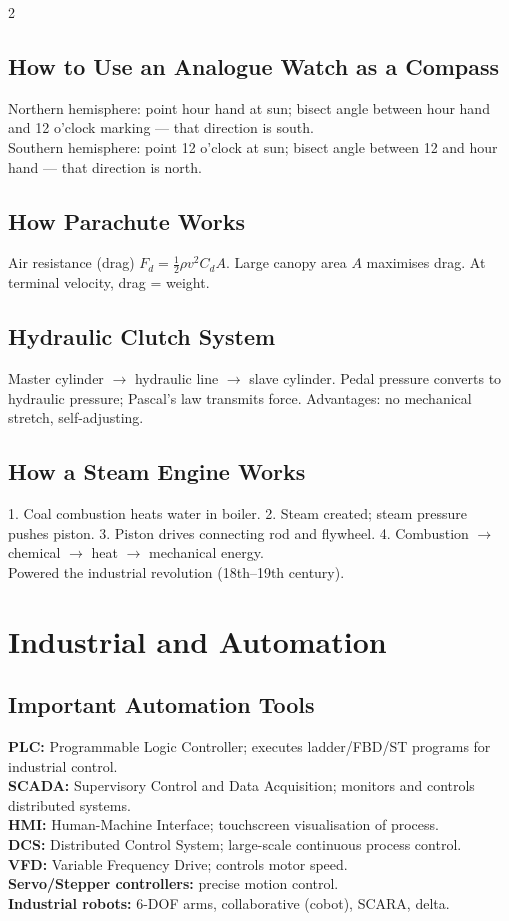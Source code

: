 \documentclass[10pt,a4paper]{article}
\begin{document}
\begin{multicols}{2}
\subsection{How to Use an Analogue Watch as a Compass}
Northern hemisphere: point hour hand at sun; bisect angle between hour hand and 12 o'clock marking --- that direction is south.\\
Southern hemisphere: point 12 o'clock at sun; bisect angle between 12 and hour hand --- that direction is north.

\subsection{How Parachute Works}
Air resistance (drag) $F_d = \frac{1}{2}\rho v^2 C_d A$. Large canopy area $A$ maximises drag. At terminal velocity, drag = weight.

\subsection{Hydraulic Clutch System}
Master cylinder $\to$ hydraulic line $\to$ slave cylinder. Pedal pressure converts to hydraulic pressure; Pascal's law transmits force. Advantages: no mechanical stretch, self-adjusting.

\subsection{How a Steam Engine Works}
1. Coal combustion heats water in boiler. 2. Steam created; steam pressure pushes piston. 3. Piston drives connecting rod and flywheel. 4. Combustion $\to$ chemical $\to$ heat $\to$ mechanical energy.\\
Powered the industrial revolution (18th--19th century).

\section{Industrial and Automation}

\subsection{Important Automation Tools}
\textbf{PLC:} Programmable Logic Controller; executes ladder/FBD/ST programs for industrial control.\\
\textbf{SCADA:} Supervisory Control and Data Acquisition; monitors and controls distributed systems.\\
\textbf{HMI:} Human-Machine Interface; touchscreen visualisation of process.\\
\textbf{DCS:} Distributed Control System; large-scale continuous process control.\\
\textbf{VFD:} Variable Frequency Drive; controls motor speed.\\
\textbf{Servo/Stepper controllers:} precise motion control.\\
\textbf{Industrial robots:} 6-DOF arms, collaborative (cobot), SCARA, delta.


\end{multicols}
\end{document}
